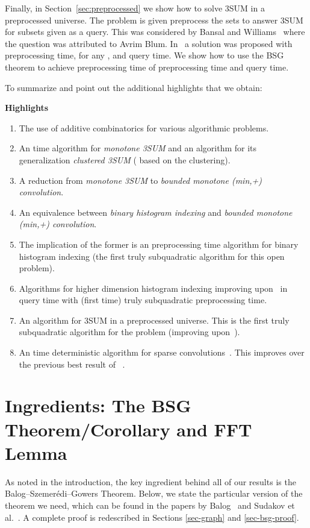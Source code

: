 \documentclass[11pt]{article}
\newcommand{\LONG}[1]{#1}\newcommand{\SHORT}[1]{}
\begin{document}
{Finally, in Section~\ref{sec:preprocessed}  we show how to solve 3SUM in a preprocessed universe. The problem is given  preprocess the sets to answer 3SUM for subsets  given as a query. This was considered by Bansal and Williams~\cite{BW12} where the question was attributed to Avrim Blum. In~\cite{BW12} a solution was proposed with  preprocessing time, for any , and  query time. We show how to use the BSG theorem to achieve preprocessing time of  preprocessing time and  query time.

\bigskip
To summarize and point out the additional highlights that we obtain:

\bigskip
\noindent
{\bf Highlights}
\begin{enumerate}
\itemsep0em
\item
The use of additive combinatorics for various algorithmic problems.
\item
An  time algorithm for {\em monotone 3SUM}  and an  algorithm for its generalization {\em clustered 3SUM} ( based on the clustering).
\item
A reduction from {\em monotone 3SUM}  to {\em bounded monotone (min,+) convolution}.
\item
An equivalence between {\em binary histogram indexing} and {\em bounded monotone (min,+) convolution}.
\item
The implication of the former is an  preprocessing time algorithm for binary histogram indexing (the first truly subquadratic algorithm for this open problem).
\item
Algorithms for higher dimension histogram indexing improving upon~\cite{KRR13} in query time with (first time) truly subquadratic preprocessing time.
\item
An  algorithm for 3SUM in a preprocessed universe. This is the first truly subquadratic algorithm for the problem (improving upon~\cite{BW12}).
\item
An  time deterministic algorithm for sparse convolutions~\cite{CH02,AKP07}. This improves over the previous best result of ~\cite{AKP07}.
\end{enumerate}

}

\section{Ingredients: The BSG Theorem/Corollary
and FFT Lemma}\label{sec:bsg}


As noted in the introduction,
the key ingredient behind all of our results is the Balog--Szemer\'edi--Gowers Theorem.  Below,
we state the particular version of the theorem we need, which can be found
in the papers by Balog~\cite{Balog07} and Sudakov et al.~\cite{SSV94}.  A complete proof is redescribed in
\LONG{Sections \ref{sec-graph} and \ref{sec-bsg-proof}}\SHORT{the full paper}.
\end{document}
